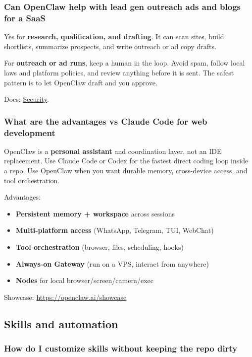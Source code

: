 \subsubsection{Can OpenClaw help with lead gen outreach ads and blogs for a SaaS}


Yes for \textbf{research, qualification, and drafting}. It can scan sites, build shortlists,
summarize prospects, and write outreach or ad copy drafts.

For \textbf{outreach or ad runs}, keep a human in the loop. Avoid spam, follow local laws and
platform policies, and review anything before it is sent. The safest pattern is to let
OpenClaw draft and you approve.

Docs: \href{/gateway/security}{Security}.

\subsubsection{What are the advantages vs Claude Code for web development}


OpenClaw is a \textbf{personal assistant} and coordination layer, not an IDE replacement. Use
Claude Code or Codex for the fastest direct coding loop inside a repo. Use OpenClaw when you
want durable memory, cross-device access, and tool orchestration.

Advantages:

\begin{itemize}
  \item \textbf{Persistent memory + workspace} across sessions
  \item \textbf{Multi-platform access} (WhatsApp, Telegram, TUI, WebChat)
  \item \textbf{Tool orchestration} (browser, files, scheduling, hooks)
  \item \textbf{Always-on Gateway} (run on a VPS, interact from anywhere)
  \item \textbf{Nodes} for local browser/screen/camera/exec
\end{itemize}


Showcase: \href{https://openclaw.ai/showcase}{https://openclaw.ai/showcase}

\subsection{Skills and automation}


\subsubsection{How do I customize skills without keeping the repo dirty}


